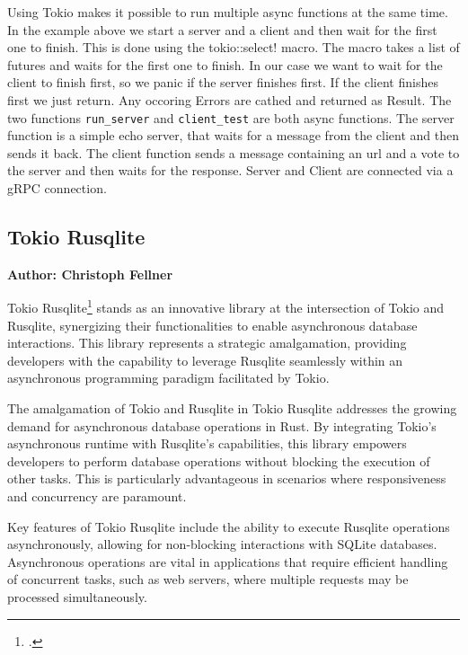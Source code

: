 Using Tokio makes it possible to run multiple async functions at the same time. In the example above we start a server and a client and then wait for the first one to finish. 
This is done using the tokio::select! macro. The macro takes a list of futures and waits for the first one to finish. In our case we want to wait for the client to finish 
first, so we panic if the server finishes first. If the client finishes first we just return. Any occoring Errors are cathed and returned as Result.
The two functions \verb+run_server+ and \verb+client_test+ are both async functions. The server function is a simple echo server, that waits for a message from the client and 
then sends it back. The client function sends a message containing an url and a vote to the server and then waits for the response. Server and Client are connected via a gRPC 
connection. 

\subsection{Tokio Rusqlite}
\textbf{Author: Christoph Fellner}

Tokio Rusqlite\footcite{tokiolite} stands as an innovative library at the intersection of Tokio and Rusqlite, synergizing their functionalities to enable 
asynchronous database interactions. This library represents a strategic amalgamation, providing developers with the capability to leverage Rusqlite seamlessly 
within an asynchronous programming paradigm facilitated by Tokio.\newline

The amalgamation of Tokio and Rusqlite in Tokio Rusqlite addresses the growing demand for asynchronous database operations in Rust. By integrating Tokio's 
asynchronous runtime with Rusqlite's capabilities, this library empowers developers to perform database operations without blocking the execution of other tasks.
This is particularly advantageous in scenarios where responsiveness and concurrency are paramount.\newline

Key features of Tokio Rusqlite include the ability to execute Rusqlite operations asynchronously, allowing for non-blocking interactions with SQLite databases. 
Asynchronous operations are vital in applications that require efficient handling of concurrent tasks, such as web servers, where multiple requests may be 
processed simultaneously.\newline

